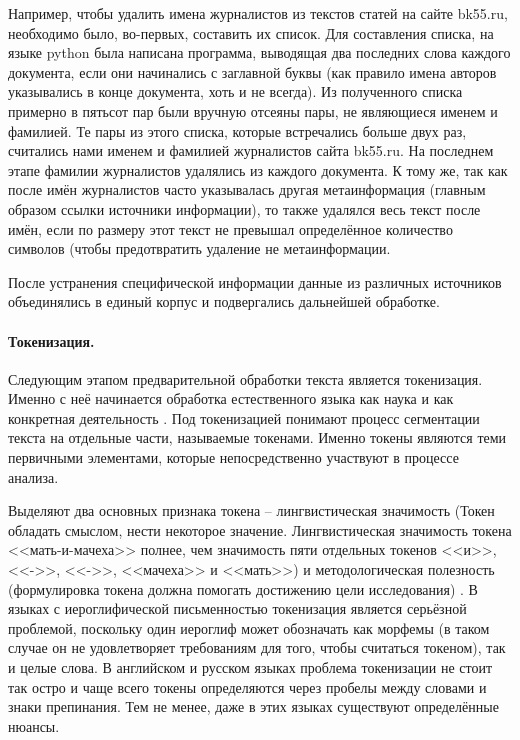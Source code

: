 Например, чтобы удалить имена журналистов из текстов статей на сайте bk55.ru, необходимо было, во-первых, составить их список. Для составления списка, на языке python была написана программа, выводящая два последних слова каждого документа, если они начинались с заглавной буквы (как правило имена авторов указывались в конце документа, хоть и не всегда). Из полученного списка примерно в пятьсот пар были вручную отсеяны пары, не являющиеся именем и фамилией. Те пары из этого списка, которые встречались больше двух раз, считались нами именем и фамилией журналистов сайта bk55.ru. На последнем этапе фамилии журналистов удалялись из каждого документа. К тому же, так как после имён журналистов часто указывалась другая метаинформация (главным образом ссылки источники информации), то также удалялся весь текст после имён, если по размеру этот текст не превышал определённое количество символов (чтобы предотвратить удаление не метаинформации.

После устранения специфической информации данные из различных источников объединялись в единый корпус и подвергались дальнейшей обработке.

\paragraph{Токенизация.}
Следующим этапом предварительной обработки текста является токенизация. Именно с неё начинается обработка естественного языка как наука и как конкретная деятельность \cite{Webster1992}. Под токенизацией понимают процесс сегментации текста на отдельные части, называемые токенами. Именно токены являются теми первичными элементами, которые непосредственно участвуют в процессе анализа. 

Выделяют два основных признака токена -- лингвистическая значимость (Токен обладать смыслом, нести некоторое значение. Лингвистическая значимость токена <<мать-и-мачеха>> полнее, чем значимость пяти отдельных токенов <<и>>, <<->>, <<->>, <<мачеха>> и <<мать>>) и методологическая полезность (формулировка токена должна помогать достижению цели исследования) \cite[стр. 1106]{Webster1992}. В языках с иероглифической письменностью токенизация является серьёзной проблемой, поскольку один иероглиф может обозначать как морфемы (в таком случае он не удовлетворяет требованиям для того, чтобы считаться токеном), так и целые слова. В английском и русском языках проблема токенизации не стоит так остро и чаще всего токены определяются через пробелы между словами и знаки препинания. Тем не менее, даже в этих языках существуют определённые нюансы.

